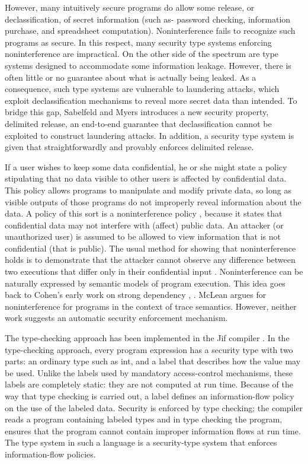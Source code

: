 However, many intuitively secure programs do allow some release, or declassification, of secret information (such as- password checking, information purchase, and spreadsheet computation). Noninterference fails to recognize such programs as secure. In this respect, many security type systems enforcing noninterference are impractical. On the other side of the spectrum are type systems designed to accommodate some information leakage. However, there is often little or no guarantee about what is actually being leaked. As a consequence, such type systems are vulnerable to laundering attacks, which exploit declassification mechanisms to reveal more secret data than intended. To bridge this gap, Sabelfeld and Myers
\cite{ref_72_sabelfeld2004model} introduces a new security property, delimited release, an end-to-end guarantee that declassification cannot be exploited to construct laundering attacks. In addition, a security type system is given that straightforwardly and provably enforces delimited release.

If a user wishes to keep some data confidential, he or
she might state a policy stipulating that no data visible
to other users is affected by confidential data. This policy
allows programs to manipulate and modify private data, so
long as visible outputs of those programs do not improperly
reveal information about the data. A policy of this sort is a
noninterference policy \cite{ref_65_goguen1982security}, because it states that confidential
data may not interfere with (affect) public data. An attacker (or unauthorized user) is assumed to be allowed
to view information that is not confidential (that is public).
The usual method for showing that noninterference holds is
to demonstrate that the attacker cannot observe any difference
between two executions that differ only in their confidential
input \cite{ref_66_goguen1984unwinding}. Noninterference can be naturally expressed by
semantic models of program execution. This idea goes back
to Cohen's early work on strong dependency \cite{ref_67_cohen1977information}, \cite{ref_68_cohen1978information}.
McLean \cite{ref_69_mclean1992proving} argues for noninterference for programs in the
context of trace semantics. However, neither work suggests an
automatic security enforcement mechanism.

The type-checking approach has been implemented
in the Jif compiler \cite{ref_48_chong:jif,ref_40_myers:jflow}.
In the type-checking approach, every program expression
has a security type with two parts: an ordinary type such as int,
and a label that describes how the value may be used. Unlike
the labels used by mandatory access-control mechanisms,
these labels are completely static: they are not computed at
run time. Because of the way that type checking is carried
out, a label defines an information-flow policy on the use of
the labeled data. Security is enforced by type checking; the
compiler reads a program containing labeled types and in type checking
the program, ensures that the program cannot contain
improper information flows at run time. The type system
in such a language is a security-type system that enforces
information-flow policies.


